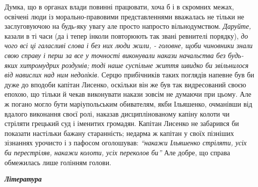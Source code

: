\documentclass[a4paper,20pt]{report}
\begin{document}
Думка, що в органах влади повинні працювати, хоча б і в скромних межах,
освічені люди із морально-правовими представленнями вважалась не тільки не заслуговуючою
на будь-яку увагу але просто напросто вільнодумством. \emph{Даруйте,} казали в ті часи
(да і тепер інколи повторюють так звані ревнителі порядку), \emph{до чого всі ці галасливі слова і 
без них люди жили, - головне, щоби чиновники знали свою справу і перш за все у точності виконували
накази начальства без будь-яких хитромудрих роздумів; тоді наше суспільне життя швидко би звільнилося
від навислих над ним недоліків.}
Серцю прибічників таких поглядів напевне був би дуже до вподоби капітан
Лисенко, оскільки він же був так видресований своєю епохою, що тільки й чекав
виконувати накази зовсім не думаючи при цьому. Але ж погано могло бути маріупольським обивателям, якби
Ільяшенко, очманівши від вдалого виконання своєї ролі, наказав дисциплінованому
капіну колоти чи стріляти грецький суд і іменитих громадян. Капітан Лисенко не
забарився би показати настільки бажану старанність; недарма ж капітан у своїх
пізніших зізнаннях урочисто і з пафосом оголошував: \emph{``накажи Ільяшенко
стріляти, усіх би перестріляв, накажи колоти, усіх переколов би''} Але добре, що справа
обмежилась лише голінням голови.

\clearpage
\begin{center}
\Huge\bfseries\em
Література
\end{center}
\end{document}
